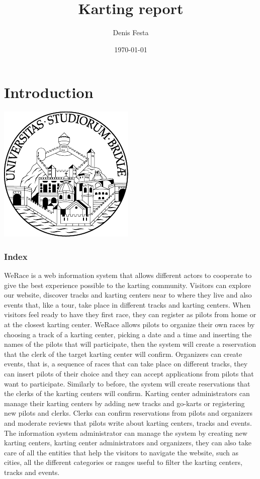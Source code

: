 \documentclass{beamer}
\title{Karting report}
\author{Denis Festa}
\date{\today}
\newcommand{\kc}{WeRace}
\begin{document}
\section*{Introduction}

\begin{frame}
    \titlepage
    \centering
    \includegraphics[width=0.2\linewidth]{unibs-circ-logo.pdf}
\end{frame}


\begin{frame}
    \frametitle{Index}
    \tableofcontents
\end{frame}


\begin{frame}
\footnotesize
\kc{} is a web information system that allows different actors to cooperate
to give the best experience possible to the karting community.
Visitors can explore our website, discover tracks and karting centers 
near to where they live and also events that, like a tour, take place 
in different tracks and karting centers. When visitors feel ready
to have they first race, they can register as pilots from home or 
at the closest karting center. \kc{} allows pilots to organize
their own races by choosing a track of a karting center, picking a date 
and a time and inserting the names of the pilots that will participate,
then the system will create a reservation that the clerk of the target karting center
will confirm. Organizers can create events, that is, a sequence of races that can take
place on different tracks, they can insert pilots of their choice and they can accept
applications from pilots that want to participate. Similarly to before, the system 
will create reservations that the clerks of the karting centers will confirm.
Karting center administrators can manage their karting centers by adding new
tracks and go-karts or registering new pilots and clerks.
Clerks can confirm reservations from pilots and organizers and moderate reviews
that pilots write about karting centers, tracks and events.
The information system administrator can manage the system by creating new karting centers,
karting center administrators and organizers, they can also take care of all the
entities that help the visitors to navigate the website, such as cities, all the different 
categories or ranges useful to filter the karting centers, tracks and events.
\end{frame}
\end{document}
